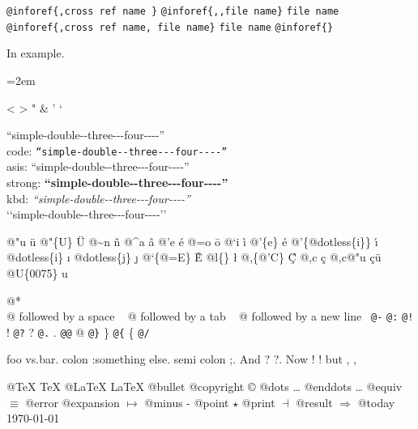 \documentclass{book}
\begin{document}
\texttt{@inforef\{,cross ref name \}} 
\texttt{@inforef\{,,file name\}} \texttt{file name}
\texttt{@inforef\{,cross ref name, file name\}} \texttt{file name}
\texttt{@inforef\{\}} 



In example.
\par\begingroup\obeylines\obeyspaces\frenchspacing\leftskip=2em\relax\parskip=0pt\relax\ttfamily{}%

<
>
"
\&
'
`

``simple-double{-}{-}three{-}{-}{-}four{-}{-}{-}-''\leavevmode{}\\
code: \texttt{``simple-double{-}{-}three{-}{-}{-}four{-}{-}{-}-''} \leavevmode{}\\
asis: ``simple-double{-}{-}three{-}{-}{-}four{-}{-}{-}-'' \leavevmode{}\\
strong: \textbf{``simple-double{-}{-}three{-}{-}{-}four{-}{-}{-}-''} \leavevmode{}\\
kbd: {\ttfamily\textsl{``simple-double{-}{-}three{-}{-}{-}four{-}{-}{-}-''}} \leavevmode{}\\

`\hbox{}`simple-double-\hbox{}-three{-}{-}{-}four{-}{-}{-}-'\hbox{}'\leavevmode{}\\

%
%
%
%

@"u \"{u} 
@"\{U\} \"{U} 
@\~{}n \~{n}
@\^{}a \^{a}
@'e \'{e}
@=o \={o}
@`i \`{i}
@'\{e\} \'{e}
@'\{@dotless\{i\}\} \'{\i{}} 
@dotless\{i\} \i{}
@dotless\{j\} \j{}
@`\{@=E\} \`{\={E}} 
@l\{\} \l{}
@,\{@'C\} \c{\'{C}}
@,c \c{c}
@,c@"u \c{c}\"{u} \leavevmode{}\\

@U\{0075\} u

@* \leavevmode{}\\
@ followed by a space
\ {}
@ followed by a tab
\ {}
@ followed by a new line
\ {}\texttt{@-} \-{}
\texttt{@:} \@
\texttt{@!} \@!
\texttt{@?} \@?
\texttt{@.} \@.
\texttt{@@} @
\texttt{@\}} \}
\texttt{@\{} \{
\texttt{@/} 

foo vs.\@ bar. 
colon :\@And something else.
semi colon ;\@.
And ? ?\@.
Now ! !\@@
but , ,\@

@TeX \TeX{}
@LaTeX \LaTeX{}
@bullet \textbullet{}
@copyright \copyright{}
@dots \dots{}\@
@enddots \dots{}
@equiv $\equiv{}$
@error 
@expansion $\mapsto{}$
@minus -
@point $\star{}$
@print $\dashv{}$
@result $\Rightarrow{}$
@today \today{}
\end{document}
